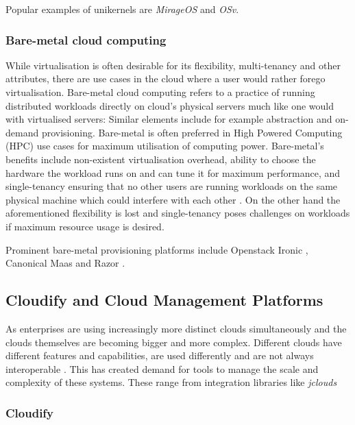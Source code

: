 Popular examples of unikernels are \textit{MirageOS}\cite{mirage} and \textit{OSv}\cite{osv}.

\subsubsection{Bare-metal cloud computing}

While virtualisation is often desirable for its flexibility, multi-tenancy and other attributes, there are use cases in the cloud where a user would rather forego virtualisation. Bare-metal cloud computing refers to a practice of running distributed workloads directly on  cloud's physical servers much like one would with virtualised servers: Similar elements include for example abstraction and on-demand provisioning. Bare-metal is often preferred in High Powered Computing (HPC) use cases for maximum utilisation of computing power. Bare-metal's benefits include non-existent virtualisation overhead, ability to choose the hardware the workload runs on and can tune it for maximum performance, and single-tenancy ensuring that no other users are running workloads on the same physical machine which could interfere with each other \cite{baremetal}. On the other hand the aforementioned flexibility is lost and single-tenancy poses challenges on workloads if maximum resource usage is desired. 

Prominent bare-metal provisioning platforms include Openstack Ironic \cite{ironic}, Canonical Maas \cite{MaaS} and Razor \cite{razor}.

\subsection{Cloudify and Cloud Management Platforms}

As enterprises are using increasingly more distinct clouds simultaneously \cite{stateofthecloud} and the clouds themselves are becoming bigger and more complex. Different clouds have different features and capabilities, are used differently and are not always interoperable \cite{multicloudprovisioning}. This has created demand for tools to manage the scale and complexity of these systems. These range from integration libraries like \textit{jclouds} \cite{jclouds}

\subsubsection{Cloudify}

